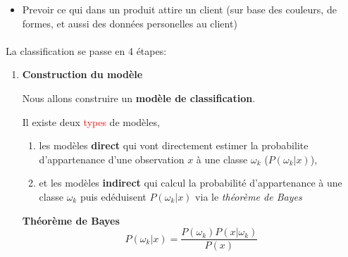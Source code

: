 \documentclass[a4paper, 11pt, onecolumn]{article}
\begin{document}
\begin{enumerate}
\begin{itemize}
\item Prevoir ce qui dans un produit attire un client (sur base des couleurs,
de formes, et aussi des données personelles au client)
\end{itemize}

\paragraph{}La classification se passe en 4 étapes:
\begin{enumerate}
\item \textbf{Construction du modèle}

  Nous allons construire un \textbf{modèle de classification}. 
  
  Il existe deux \textcolor{red}{types} de modèles, 
  \begin{enumerate}
    \item les modèles \textbf{direct} qui vont directement estimer la probabilite d'appartenance d'une observation $x$ à une classe $\omega_k$ ($P(\omega_k|x)$),
    \item et les modèles \textbf{indirect} qui calcul la probabilité d'appartenance à une classe $\omega_k$ puis edéduisent $P(\omega_k|x)$ via le \textit{théorème de Bayes}
  \end{enumerate}

\begin{framed}
\textbf{Théorème de Bayes}
$$P(\omega_k|x)=\frac{P(\omega_k)P(x|\omega_k)}{P(x)}$$
\end{framed}


\end{enumerate}
\end{enumerate}
\end{document}
